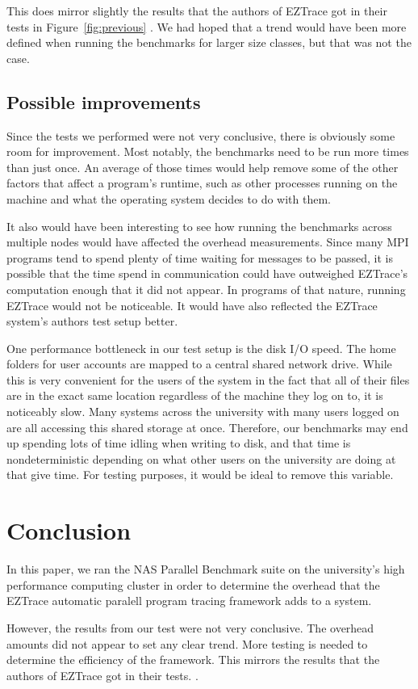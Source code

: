 \documentclass[12pt]{article}
\begin{document}
This does mirror slightly the results that the authors of EZTrace got in their tests in Figure~\ref{fig:previous} \cite{Trahay2011}. 
We had hoped that a trend would have been more defined when running the benchmarks for larger size classes, but that was 
not the case.

\subsection{Possible improvements}

Since the tests we performed were not very conclusive, there is obviously some room for improvement. Most notably, the 
benchmarks need to be run more times than just once. An average of those times would help remove some of the other factors 
that affect a program's runtime, such as other processes running on the machine and what the operating system decides to 
do with them.

It also would have been interesting to see how running the benchmarks across multiple nodes would have affected the overhead 
measurements. Since many MPI programs tend to spend plenty of time waiting for messages to be passed, it is possible that 
the time spend in communication could have outweighed EZTrace's computation enough that it did not appear. In programs of 
that nature, running EZTrace would not be noticeable. It would have also reflected the EZTrace system's authors test setup 
better.

One performance bottleneck in our test setup is the disk I/O speed. The home folders for user accounts are mapped to a 
central shared network drive. While this is very convenient for the users of the system in the fact that all of their 
files are in the exact same location regardless of the machine they log on to, it is noticeably slow. Many systems across 
the university with many users logged on are all accessing this shared storage at once. Therefore, our benchmarks may end 
up spending lots of time idling when writing to disk, and that time is nondeterministic depending on what other users on 
the university are doing at that give time. For testing purposes, it would be ideal to remove this variable.

\section{Conclusion}

In this paper, we ran the NAS Parallel Benchmark suite \cite{Bailey1991} on the university's high performance computing 
cluster in order to determine the overhead that the EZTrace automatic paralell program tracing framework \cite{Trahay2011} 
adds to a system. 

However, the results from our test were not very conclusive. The overhead amounts did not appear to set any clear trend. 
More testing is needed to determine the efficiency of the framework. This mirrors the results that the authors of EZTrace 
got in their tests. \cite{Trahay2011}. 



\end{document}

